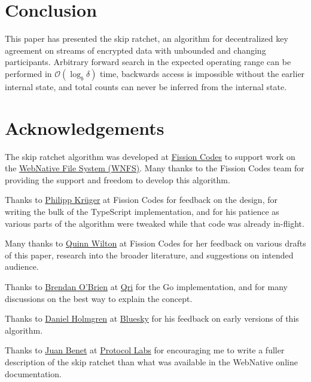 \documentclass{article}
\begin{document}
	\section{Conclusion}
	
	This paper has presented the skip ratchet, an algorithm for decentralized key agreement on streams of encrypted data with unbounded and changing participants. Arbitrary forward search in the expected operating range can be performed in $\mathcal{O}(\log_{b} \delta)$ time, backwards access is impossible without the earlier internal state, and total counts can never be inferred from the internal state.
    
    \section{Acknowledgements}
    
    The skip ratchet algorithm was developed at \href{https://fission.codes}{Fission Codes} to support work on the \href{https://github.com/fission-suite/webnative}{WebNative File System (WNFS)}. Many thanks to the Fission Codes team for providing the support and freedom to develop this algorithm.
    
    Thanks to \href{https://github.com/matheus23/}{Philipp Krüger} at Fission Codes for  feedback on the design, for writing the bulk of the TypeScript implementation\cite{ts-wnfs-ratchet}, and for his patience as various parts of the algorithm were tweaked while that code was already in-flight.
    
    Many thanks to \href{https://github.com/QuinnWilton}{Quinn Wilton} at Fission Codes for her feedback on various drafts of this paper, research into the broader literature, and suggestions on intended audience.
    
    Thanks to \href{https://github.com/b5/}{Brendan O'Brien} at \href{https://qri.io/}{Qri} for the {Go implementation}\cite{go-wnfs-ratchet}, and for many discussions on the best way to explain the concept.
    
    Thanks to \href{https://github.com/dholms}{Daniel Holmgren} at \href{https://blueskyweb.xyz}{Bluesky} for his feedback on early versions of this algorithm.
    
    Thanks to \href{https://github.com/jbenet/}{Juan Benet} at \href{https://protocol.ai/}{Protocol Labs} for encouraging me to write a fuller description of the skip ratchet than what was available in the WebNative online documentation.
    
    \printbibliography[title={References}]
\end{document}
